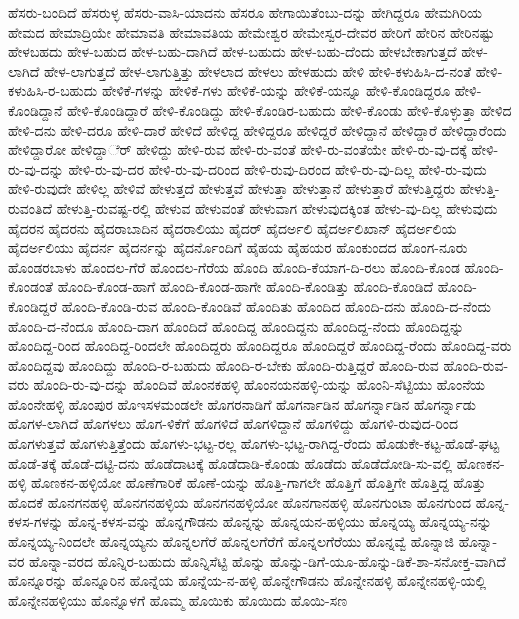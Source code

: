 {ಹೆಸರು-ಬಂದಿದೆ
ಹೆಸರುಳ್ಳ
ಹೆಸರು-ವಾಸಿ-ಯಾದನು
ಹೆಸರೂ
ಹೇಗಾಯಿತೆಂಬು-ದನ್ನು
ಹೇಗಿದ್ದರೂ
ಹೇಮಗಿರಿಯ
ಹೇಮದ
ಹೇಮಾದ್ರಿಯೇ
ಹೇಮಾವತಿ
ಹೇಮಾವತಿಯ
ಹೇಮೇಶ್ವರ
ಹೇಮೇಸ್ವರ-ದೇವರ
ಹೇರಿಗೆ
ಹೇರಿನ
ಹೇರಿನಷ್ಟು
ಹೇಳಬಹದು
ಹೇಳ-ಬಹುದ
ಹೇಳ-ಬಹು-ದಾಗಿದೆ
ಹೇಳ-ಬಹುದು
ಹೇಳ-ಬಹು-ದೆಂದು
ಹೇಳಬೇಕಾಗುತ್ತದೆ
ಹೇಳ-ಲಾಗಿದೆ
ಹೇಳ-ಲಾಗುತ್ತದೆ
ಹೇಳ-ಲಾಗುತ್ತಿತ್ತು
ಹೇಳಲಾದ
ಹೇಳಲು
ಹೇಳಹುದು
ಹೇಳಿ
ಹೇಳಿ-ಕಳುಹಿಸಿ-ದ-ನಂತೆ
ಹೇಳಿ-ಕಳುಹಿಸಿ-ರ-ಬಹುದು
ಹೇಳಿಕೆ-ಗಳನ್ನು
ಹೇಳಿಕೆ-ಗಳು
ಹೇಳಿಕೆ-ಯನ್ನು
ಹೇಳಿಕೆ-ಯನ್ನೂ
ಹೇಳಿ-ಕೊಂಡಿದ್ದರೂ
ಹೇಳಿ-ಕೊಂಡಿದ್ದಾನೆ
ಹೇಳಿ-ಕೊಂಡಿದ್ದಾರೆ
ಹೇಳಿ-ಕೊಂಡಿದ್ದು
ಹೇಳಿ-ಕೊಂಡಿರ-ಬಹುದು
ಹೇಳಿ-ಕೊಂಡು
ಹೇಳಿ-ಕೊಳ್ಳುತ್ತಾ
ಹೇಳಿದ
ಹೇಳಿ-ದನು
ಹೇಳಿ-ದರೂ
ಹೇಳಿ-ದಾರೆ
ಹೇಳಿದೆ
ಹೇಳಿದ್ದ
ಹೇಳಿದ್ದರೂ
ಹೇಳಿದ್ದರೆ
ಹೇಳಿದ್ದಾನೆ
ಹೇಳಿದ್ದಾರೆ
ಹೇಳಿದ್ದಾರೆಂದು
ಹೇಳಿದ್ದಾರೋ
ಹೇಳಿದ್ದಾರ್ೆ
ಹೇಳಿದ್ದು
ಹೇಳಿ-ರುವ
ಹೇಳಿ-ರು-ವಂತೆ
ಹೇಳಿ-ರು-ವಂತೆಯೇ
ಹೇಳಿ-ರು-ವು-ದಕ್ಕೆ
ಹೇಳಿ-ರು-ವು-ದನ್ನು
ಹೇಳಿ-ರು-ವು-ದರ
ಹೇಳಿ-ರು-ವು-ದರಿಂದ
ಹೇಳಿ-ರುವು-ದಿರಂದ
ಹೇಳಿ-ರು-ವು-ದಿಲ್ಲ
ಹೇಳಿ-ರು-ವುದು
ಹೇಳಿ-ರುವುದೇ
ಹೇಳಿಲ್ಲ
ಹೇಳಿವೆ
ಹೇಳುತ್ತದೆ
ಹೇಳುತ್ತವೆ
ಹೇಳುತ್ತಾ
ಹೇಳುತ್ತಾನೆ
ಹೇಳುತ್ತಾರೆ
ಹೇಳುತ್ತಿದ್ದರು
ಹೇಳುತ್ತಿ-ರುವಂತಿದೆ
ಹೇಳುತ್ತಿ-ರುವಷ್ಟ-ರಲ್ಲಿ
ಹೇಳುವ
ಹೇಳುವಂತೆ
ಹೇಳುವಾಗ
ಹೇಳುವುದಕ್ಕಿಂತ
ಹೇಳು-ವು-ದಿಲ್ಲ
ಹೇಳುವುದು
ಹೈದರನ
ಹೈದರನು
ಹೈದರಾಬಾದಿನ
ಹೈದರಾಲಿಯು
ಹೈದರ್
ಹೈದರ್ಅಲಿ
ಹೈದರ್ಅಲಿಖಾನ್
ಹೈದರ್ಅಲಿಯ
ಹೈದರ್ಅಲಿಯು
ಹೈದರ್ನ
ಹೈದರ್ನನ್ನು
ಹೈದರ್ನೊಂದಿಗೆ
ಹೈಹಯ
ಹೈಹಯರ
ಹೊಂಕುಂದದ
ಹೊಂಗ-ನೂರು
ಹೊಂಡರಬಾಳು
ಹೊಂದಲ-ಗೆರೆ
ಹೊಂದಲ-ಗೆರೆಯ
ಹೊಂದಿ
ಹೊಂದಿ-ಕೆಯಾಗ-ದಿ-ರಲು
ಹೊಂದಿ-ಕೊಂಡ
ಹೊಂದಿ-ಕೊಂಡಂತೆ
ಹೊಂದಿ-ಕೊಂಡ-ಹಾಗೆ
ಹೊಂದಿ-ಕೊಂಡ-ಹಾಗೇ
ಹೊಂದಿ-ಕೊಂಡಿತ್ತು
ಹೊಂದಿ-ಕೊಂಡಿದೆ
ಹೊಂದಿ-ಕೊಂಡಿದ್ದರೆ
ಹೊಂದಿ-ಕೊಂಡಿ-ರುವ
ಹೊಂದಿ-ಕೊಂಡಿವೆ
ಹೊಂದಿತು
ಹೊಂದಿದ
ಹೊಂದಿ-ದನು
ಹೊಂದಿ-ದ-ನೆಂದು
ಹೊಂದಿ-ದ-ನೆಂದೂ
ಹೊಂದಿ-ದಾಗ
ಹೊಂದಿದೆ
ಹೊಂದಿದ್ದ
ಹೊಂದಿದ್ದನು
ಹೊಂದಿದ್ದ-ನೆಂದು
ಹೊಂದಿದ್ದನ್ನು
ಹೊಂದಿದ್ದ-ರಿಂದ
ಹೊಂದಿದ್ದ-ರಿಂದಲೇ
ಹೊಂದಿದ್ದರು
ಹೊಂದಿದ್ದರೂ
ಹೊಂದಿದ್ದರೆ
ಹೊಂದಿದ್ದ-ರೆಂದು
ಹೊಂದಿದ್ದ-ವರು
ಹೊಂದಿದ್ದವು
ಹೊಂದಿದ್ದು
ಹೊಂದಿ-ರ-ಬಹುದು
ಹೊಂದಿ-ರ-ಬೇಕು
ಹೊಂದಿ-ರುತ್ತಿದ್ದರೆ
ಹೊಂದಿ-ರುವ
ಹೊಂದಿ-ರುವ-ವರು
ಹೊಂದಿ-ರು-ವು-ದನ್ನು
ಹೊಂದಿವೆ
ಹೊಂನಕಹಳ್ಳಿ
ಹೊಂನಯನಹಳ್ಳಿ-ಯನ್ನು
ಹೊಂನಿ-ಸೆಟ್ಟಿಯು
ಹೊಂನೆಯ
ಹೊಂನೇಹಳ್ಳಿ
ಹೊಂಪುರ
ಹೊಇಸಳಮಂಡಲೇ
ಹೊಗರನಾಡಿಗೆ
ಹೊಗರ್ನಾಡಿನ
ಹೊಗರ್ನ್ನಾಡಿನ
ಹೊಗರ್ನ್ನಾಡು
ಹೊಗಳ-ಲಾಗಿದೆ
ಹೊಗಳಲು
ಹೊಗ-ಳಿಕೆಗೆ
ಹೊಗಳಿದೆ
ಹೊಗಳಿದ್ದಾನೆ
ಹೊಗಳಿದ್ದು
ಹೊಗಳಿ-ರುವುದ-ರಿಂದ
ಹೊಗಳುತ್ತವೆ
ಹೊಗಳುತ್ತಿತ್ತೆಂದು
ಹೊಗಳು-ಭಟ್ಟ-ರಲ್ಲ
ಹೊಗಳು-ಭಟ್ಟ-ರಾಗಿದ್ದ-ರೆಂದು
ಹೊಡುಕೇ-ಕಟ್ಟ-ಹೊಡೆ-ಘಟ್ಟ
ಹೊಡೆ-ತಕ್ಕೆ
ಹೊಡೆ-ದಟ್ಟಿ-ದನು
ಹೊಡೆದಾಟಕ್ಕೆ
ಹೊಡೆದಾಡಿ-ಕೊಂಡು
ಹೊಡೆದು
ಹೊಡೆದೋಡಿ-ಸು-ವಲ್ಲಿ
ಹೊಣಕನ-ಹಳ್ಳಿ
ಹೊಣಕನ-ಹಳ್ಳಿಯೋ
ಹೊಣೆಗಾರಿಕೆ
ಹೊಣೆ-ಯನ್ನು
ಹೊತ್ತಿ-ಗಾಗಲೇ
ಹೊತ್ತಿಗೆ
ಹೊತ್ತಿಗೇ
ಹೊತ್ತಿದ್ದ
ಹೊತ್ತು
ಹೊದಕೆ
ಹೊನಗನಹಳ್ಳಿ
ಹೊನಗನಹಳ್ಳಿಯ
ಹೊನಗನಹಳ್ಳಿಯೋ
ಹೊನಗಾನಹಳ್ಳಿ
ಹೊನಗುಂಟಾ
ಹೊನಗುಂದ
ಹೊನ್ನ-ಕಳಸ-ಗಳನ್ನು
ಹೊನ್ನ-ಕಳಸ-ವನ್ನು
ಹೊನ್ನಗೌಡನು
ಹೊನ್ನನ್ನು
ಹೊನ್ನಯನ-ಹಳ್ಳಿಯು
ಹೊನ್ನಯ್ಯ
ಹೊನ್ನಯ್ಯ-ನನ್ನು
ಹೊನ್ನಯ್ಯ-ನಿಂದಲೇ
ಹೊನ್ನಯ್ಯನು
ಹೊನ್ನಲಗೆರೆ
ಹೊನ್ನಲಗೆರೆಗೆ
ಹೊನ್ನಲಗೆರೆಯು
ಹೊನ್ನವ್ವೆ
ಹೊನ್ನಾಜಿ
ಹೊನ್ನಾ-ವರ
ಹೊನ್ನಾ-ವರದ
ಹೊನ್ನಿರ-ಬಹುದು
ಹೊನ್ನಿಸೆಟ್ಟಿ
ಹೊನ್ನು
ಹೊನ್ನು-ಡಿಗೆ-ಯೂ-ಹೊನ್ನು-ಡಿಕೆ-ಶಾ-ಸನೋಕ್ತ-ವಾಗಿದೆ
ಹೊನ್ನೂರನ್ನು
ಹೊನ್ನೂರಿನ
ಹೊನ್ನೆಯ
ಹೊನ್ನೆಯ-ನ-ಹಳ್ಳಿ
ಹೊನ್ನೇಗೌಡನು
ಹೊನ್ನೇನಹಳ್ಳಿ
ಹೊನ್ನೇನಹಳ್ಳಿ-ಯಲ್ಲಿ
ಹೊನ್ನೇನಹಳ್ಳಿಯು
ಹೊನ್ನೊಳಗೆ
ಹೊಮ್ಮ
ಹೊಯಿಕು
ಹೊಯಿದು
ಹೊಯಿ-ಸಣ
}

